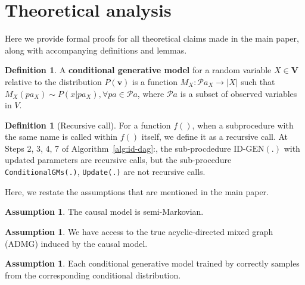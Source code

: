 \documentclass{article}
\newcommand{\red}{\textcolor{red}}
\newcommand{\V}{\mathbf{V}}
\newcommand{\vb}{\mathbf{v}}
\newcommand{\idgen}{\text{ID-GEN}\xspace}
\newcommand{\condgm}{\texttt{ConditionalGMs(.)}\xspace}
\newcommand{\stepsev}{\texttt{Update(.)}\xspace}
\theoremstyle{plain}
\theoremstyle{definition}
\newtheorem{definition}[theorem]{Definition}
\newtheorem{assumption}[theorem]{Assumption}
\theoremstyle{remark}
\begin{document}




\section{Theoretical analysis}
\label{appex:theoretical-proofs}
Here we provide formal proofs for all theoretical claims made in the main paper, along with accompanying definitions and lemmas. 



\begin{definition}
	A \textbf{conditional generative model} for a random variable $X\in \V$ relative to the distribution $P(\vb)$ is a function $M_X:\mathcal{P}a_X\rightarrow {|X|}$ such that $M_X(pa_X)\sim P(x|pa_X), \forall pa\in \mathcal{P}a$, where $\mathcal{P}a$ is a subset of observed variables in $V$. 
\end{definition}


\begin{definition}[Recursive call]
	For a function $f()$, when a subprocedure with the same name is called within $f()$ itself, we define it as a recursive call. At Steps 2, 3, 4, 7 of Algorithm~\ref{alg:id-dag}:\idgen, the sub-procdedure $\idgen(.)$ with updated parameters are recursive calls, but the sub-procedure \condgm, \stepsev are not recursive calls.
\end{definition}
Here, we restate the assumptions that are mentioned in the main paper.
\begin{assumption}
	\label{assum:semi-mark}
	The causal model is semi-Markovian.
\end{assumption}

\begin{assumption}
	\label{assum:admg}
	We have access to the true acyclic-directed mixed graph (ADMG) induced by the causal model.
\end{assumption}

\begin{assumption}
	\label{assum:correct_cond}
	Each conditional generative model trained by \idgen correctly samples from the corresponding conditional distribution.
\end{assumption}
\end{document}
